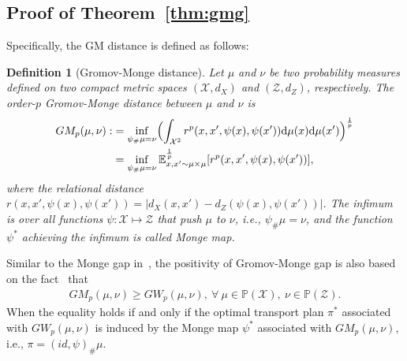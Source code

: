 \documentclass{article}
\newtheorem{definition}{Definition}
\begin{document}
\subsection{Proof of Theorem~\ref{thm:gmg}}
Specifically, the GM distance is defined as follows:
\begin{definition}[Gromov-Monge distance]\label{def-gromov-monge}
Let $\mu$ and $\nu$ be two probability measures defined on two compact metric spaces $(\mathcal{X},d_{X})$ and $(\mathcal{Z},d_{Z})$, respectively. 
The order-$p$ Gromov-Monge distance between $\mu$ and $\nu$ is
\begin{eqnarray}\label{eq:gmd}
\begin{aligned}
GM_p(\mu,\nu):&=\inf_{\psi_{\#}\mu=\nu}\Bigl(\int_{\mathcal{X}^2}r^p(x,x',\psi(x),\psi(x'))\mathrm{d}\mu(x)\mathrm{d}\mu(x')\Bigr)^{\frac{1}{p}}\\
&=\inf_{\psi_{\#}\mu=\nu}\mathbb{E}_{x,x'\sim \mu\times\mu}^{\frac{1}{p}}[r^p(x,x',\psi(x),\psi(x'))],\\
\end{aligned}
\end{eqnarray}
where the relational distance $r(x,x',\psi(x),\psi(x'))=|d_{X}(x,x')-d_Z(\psi(x),\psi(x'))|$.
The infimum is over all functions $\psi:\mathcal{X}\mapsto\mathcal{Z}$ that push $\mu$ to $\nu$, i.e., $\psi_{\#}\mu=\nu$, and the function $\psi^*$ achieving the infimum is called Monge map.
\end{definition}

Similar to the Monge gap in~\cite{uscidda2023monge}, the positivity of Gromov-Monge gap is also based on the fact~\cite{memoli2022distance} that
\begin{eqnarray}
    GM_p(\mu,\nu)\geq GW_{p}(\mu, \nu),~\forall ~\mu\in\mathbb{P}(\mathcal{X}),~\nu\in\mathbb{P}(\mathcal{Z}).
\end{eqnarray}
When the equality holds if and only if the optimal transport plan $\pi^*$ associated with $GW_{p}(\mu, \nu)$ is induced by the Monge map $\psi^*$ associated with $GM_p(\mu,\nu)$, i.e., $\pi=(id,\psi)_{\#}\mu$.
\end{document}

